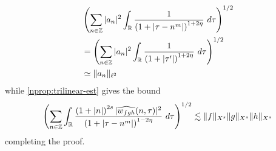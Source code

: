 \begin{equation*}
	\begin{split}
		& \left( \sum_{n \in \zz} | a_{n} |^2\int_{\rr} \frac{1}{\left( 1 + | \tau -
		n^{m } | \right)^{1 + 2 \eta}} \ d \tau  
		\right)^{1/2} 
		\\
		& = \left ( \sum_{n \in \zz}
		| a_n |^2 
		\int_{\rr} \frac{1}{\left( 1 + | \tau' | \right)^{1 + 2 \eta}} \ d 
		\tau \right)^{1/2}
		\\
		& \simeq \|a_n\|_{\ell^2}
		\end{split}
\end{equation*}
while \cref{nprop:trilinear-est} gives the bound
\begin{equation*}
	\begin{split}
		\left ( \sum_{n \in \mathbb{Z}}\int_{\mathbb{R}} \frac{\left (1 + |n| \right )^{2s} | \widehat{w_{fgh}}(n, \tau) 
		|^2}{\left( 1 + | \tau - n^{m } | \right)^{1 - 2 \eta}}\ d \tau 
		\right)^{1/2} \lesssim \|f\|_{X^s} \|g\|_{X^s} \|h\|_{X^s}
	\end{split}
\end{equation*}
%
completing the proof.
\qquad \qedsymbol
%
%
%
